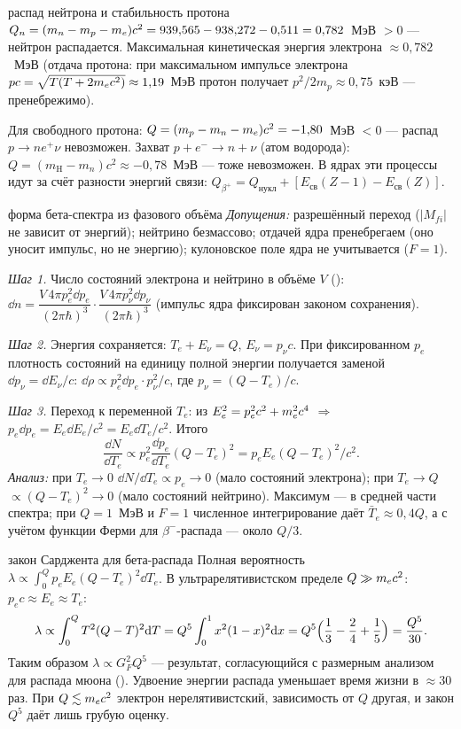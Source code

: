 \begin{derivation}[label=der:20:neutron]{распад нейтрона и стабильность протона}
$Q_n=(m_n-m_p-m_e)c^2=939{,}565-938{,}272-0{,}511=0{,}782$~МэВ $>0$ — нейтрон распадается.
Максимальная кинетическая энергия электрона $\approx0{,}782$~МэВ (отдача протона: при максимальном импульсе электрона
$pc=\sqrt{T(T+2m_e c^2)}\approx1{,}19$~МэВ протон получает $p^2/2m_p\approx0{,}75$~кэВ — пренебрежимо).

Для свободного протона: $Q=(m_p-m_n-m_e)c^2=-1{,}80$~МэВ $<0$ — распад $p\to ne^+\nu$ невозможен. Захват $p+e^-\to n+\nu$ (атом водорода):
$Q=(m_{\mathrm H}-m_n)c^2\approx-0{,}78$~МэВ — тоже невозможен. В ядрах эти процессы идут за счёт разности энергий связи:
$Q_{\beta^+}=Q_{\text{нукл}}+[E_{\text{св}}(Z-1)-E_{\text{св}}(Z)]$.
\end{derivation}

\begin{derivation}[label=der:20:spectrum]{форма бета-спектра из фазового объёма}
\emph{Допущения:} разрешённый переход ($|M_{fi}|$ не зависит от энергий); нейтрино безмассово; отдачей ядра пренебрегаем
(оно уносит импульс, но не энергию); кулоновское поле ядра не учитывается ($F=1$).

\emph{Шаг 1.} Число состояний электрона и нейтрино в объёме $V$ ():
$\dd n=\dfrac{V\,4\pi p_e^2\dd p_e}{(2\pi\hbar)^3}\cdot\dfrac{V\,4\pi p_\nu^2\dd p_\nu}{(2\pi\hbar)^3}$ (импульс ядра фиксирован законом сохранения).

\emph{Шаг 2.} Энергия сохраняется: $T_e+E_\nu=Q$, $E_\nu=p_\nu c$. При фиксированном $p_e$ плотность состояний на единицу полной
энергии получается заменой $\dd p_\nu=\dd E_\nu/c$: $\dd\rho\propto p_e^2\dd p_e\cdot p_\nu^2/c$, где $p_\nu=(Q-T_e)/c$.

\emph{Шаг 3.} Переход к переменной $T_e$: из $E_e^2=p_e^2c^2+m_e^2c^4$ $\Rightarrow$ $p_e\dd p_e=E_e\dd E_e/c^2=E_e\dd T_e/c^2$. Итого
\[
  \frac{\dd N}{\dd T_e}\propto p_e^2\frac{\dd p_e}{\dd T_e}(Q-T_e)^2=p_eE_e(Q-T_e)^2/c^2 .
\]
\emph{Анализ:} при $T_e\to0$ $\dd N/\dd T_e\propto p_e\to0$ (мало состояний электрона); при $T_e\to Q$ $\propto(Q-T_e)^2\to0$ (мало состояний
нейтрино). Максимум — в средней части спектра; при $Q=1$~МэВ и $F=1$ численное интегрирование даёт $\bar T_e\approx0{,}4Q$, а с учётом функции Ферми для $\beta^-$-распада — около $Q/3$.
\end{derivation}

\begin{derivation}[label=der:20:sargent]{закон Сарджента для бета-распада}
Полная вероятность $\lambda\propto\int_0^Q p_eE_e(Q-T_e)^2\dd T_e$. В ультрарелятивистском пределе $Q\gg m_e c^2$: $p_ec\approx E_e\approx T_e$:
\[
  \lambda\propto\int_0^QT^2(Q-T)^2\mathrm{d} T=Q^5\int_0^1x^2(1-x)^2\mathrm{d} x=Q^5\Bigl(\frac13-\frac24+\frac15\Bigr)=\frac{Q^5}{30}.
\]
Таким образом $\lambda\propto G_F^2Q^5$ — результат, согласующийся с размерным анализом для распада мюона ().
Удвоение энергии распада уменьшает время жизни в $\approx30$ раз. При $Q\lesssim m_e c^2$ электрон нерелятивистский, зависимость от $Q$ другая, и закон $Q^5$ даёт лишь грубую оценку.
\end{derivation}

